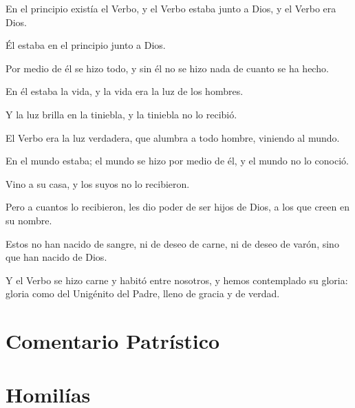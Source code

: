 \begin{scripture}
	En el principio existía el Verbo, y el Verbo estaba junto a Dios, y el Verbo era Dios.
	
	Él estaba en el principio junto a Dios.
	
	Por medio de él se hizo todo, y sin él no se hizo nada de cuanto se ha hecho.
	
	En él estaba la vida, y la vida era la luz de los hombres.
	
	Y la luz brilla en la tiniebla, y la tiniebla no lo recibió.
	
	El Verbo era la luz verdadera, que alumbra a todo hombre, viniendo al mundo.
	
	En el mundo estaba; el mundo se hizo por medio de él, y el mundo no lo conoció.
	
	Vino a su casa, y los suyos no lo recibieron.
	
	Pero a cuantos lo recibieron, les dio poder de ser hijos de Dios, a los que creen en su nombre.
	
	Estos no han nacido de sangre, ni de deseo de carne, ni de deseo de varón, sino que han nacido de Dios.
	
	Y el Verbo se hizo carne y habitó entre nosotros, y hemos contemplado su gloria: gloria como del Unigénito del Padre, lleno de gracia y de verdad.
\end{scripture}


\newsection

\section{Comentario Patrístico}





\newsection

\section{Homilías}
\homiliasNavidad





\newsection






\newsection




